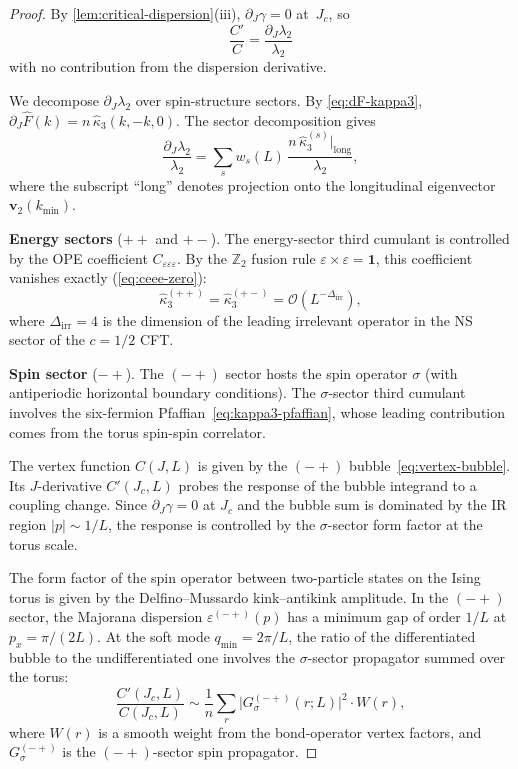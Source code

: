 \documentclass[11pt]{article}
\theoremstyle{definition}
\theoremstyle{remark}
\newcommand{\Fish}{F}
\newcommand{\Jc}{J_c}
\newcommand{\cO}{\mathcal{O}}
\newcommand{\Z}{\mathbb{Z}}
\begin{document}
\begin{proof}
By \cref{lem:critical-dispersion}(iii), $\partial_J\gamma = 0$
at~$\Jc$, so
\begin{equation}
  \frac{C'}{C} = \frac{\partial_J\lambda_2}{\lambda_2}
  \label{eq:CpC-lambda-ratio}
\end{equation}
with no contribution from the dispersion derivative.

We decompose $\partial_J\lambda_2$ over spin-structure sectors.
By \cref{eq:dF-kappa3}, $\partial_J\hat{\Fish}(k) = n\,
\hat{\kappa}_3(k, -k, 0)$. The sector decomposition gives
\begin{equation}
  \frac{\partial_J\lambda_2}{\lambda_2}
    = \sum_{s} w_s(L)\,\frac{n\,\hat{\kappa}_3^{(s)}
    \big|_{\mathrm{long}}}{\lambda_2},
  \label{eq:lambda2-sector-sum}
\end{equation}
where the subscript ``long'' denotes projection onto the
longitudinal eigenvector $\mathbf{v}_2(k_{\min})$.

\textbf{Energy sectors} ($++$ and $+-$).
The energy-sector third cumulant is controlled by the
OPE coefficient $C_{\varepsilon\varepsilon\varepsilon}$.
By the $\Z_2$ fusion rule $\varepsilon \times \varepsilon =
\mathbf{1}$, this coefficient vanishes exactly
(\cref{eq:ceee-zero}):
\begin{equation}
  \hat{\kappa}_3^{(++)} = \hat{\kappa}_3^{(+-)}
    = \cO(L^{-\Delta_{\mathrm{irr}}}),
  \label{eq:energy-sector-vanishes}
\end{equation}
where $\Delta_{\mathrm{irr}} = 4$ is the dimension of the
leading irrelevant operator in the NS sector of the
$c = 1/2$ CFT.

\textbf{Spin sector} ($-+$).
The $(-+)$ sector hosts the spin operator $\sigma$
(with antiperiodic horizontal boundary conditions).
The $\sigma$-sector third cumulant involves the
six-fermion Pfaffian~\eqref{eq:kappa3-pfaffian},
whose leading contribution comes from the torus
spin-spin correlator.

The vertex function $C(J,L)$ is given by the $(-+)$
bubble~\eqref{eq:vertex-bubble}. Its $J$-derivative
$C'(\Jc,L)$ probes the response of the bubble integrand
to a coupling change. Since $\partial_J\gamma = 0$ at
$\Jc$ and the bubble sum is dominated by the IR region
$|p| \sim 1/L$, the response is controlled by the
$\sigma$-sector form factor at the torus scale.

The form factor of the spin operator
between two-particle states on the Ising torus
is given by the Delfino--Mussardo kink--antikink amplitude.
In the $(-+)$ sector, the Majorana dispersion
$\varepsilon^{(-+)}(p)$ has a minimum gap of order $1/L$
at $p_x = \pi/(2L)$.
At the soft mode $q_{\min} = 2\pi/L$, the ratio of
the differentiated bubble to the undifferentiated one
involves the $\sigma$-sector propagator summed over the
torus:
\begin{equation}
  \frac{C'(\Jc, L)}{C(\Jc, L)} \sim
    \frac{1}{n}\sum_r
    \bigl|G_\sigma^{(-+)}(r; L)\bigr|^2
    \cdot W(r),
  \label{eq:CpC-sigma-sum}
\end{equation}
where $W(r)$ is a smooth weight from the bond-operator
vertex factors, and $G_\sigma^{(-+)}$ is the $(-+)$-sector
spin propagator.


\end{proof}
\end{document}
